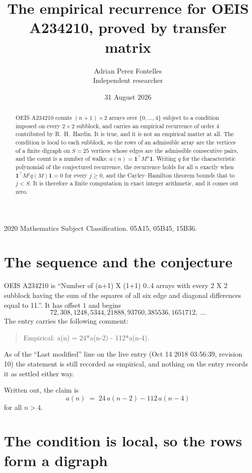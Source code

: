 \documentclass[11pt,a4paper]{article}
\title{The empirical recurrence for OEIS A234210, proved by transfer matrix}
\author{Adrian Perez Fontelles\\ \small Independent researcher}
\date{31 August 2026}
\theoremstyle{plain}
\theoremstyle{definition}
\begin{document}
\maketitle

\begin{abstract}
OEIS A234210 counts $(n+1)\times2$ arrays over $\{0,\dots,4\}$ subject to a condition imposed on
every $2\times2$ subblock, and carries an empirical recurrence of order $4$ contributed
by R.~H.~Hardin. It is true, and it is not an empirical matter at all. The condition is local
to each subblock, so the rows of an admissible array are the vertices of a finite digraph
on $S=25$ vertices whose edges are the admissible consecutive pairs, and the count is a
number of walks: $a(n)=\mathbf{1}^{\!\top}M^{n}\mathbf{1}$. Writing $q$
for the characteristic polynomial of the conjectured recurrence, the recurrence holds for all
$n$ exactly when $\mathbf{1}^{\!\top}M^{j}q(M)\mathbf{1}=0$ for every $j\ge0$, and the
Cayley--Hamilton theorem bounds that to $j<S$. It is therefore a finite computation in exact
integer arithmetic, and it comes out zero.
\end{abstract}

\noindent\small 2020 Mathematics Subject Classification. 05A15, 05B45, 15B36.\normalsize

\section{The sequence and the conjecture}

OEIS A234210 is ``Number of (n+1) X (1+1) 0..4 arrays with every 2 X 2 subblock having the sum of the squares of all six edge and diagonal differences equal to 11.''. It has offset $1$ and begins
\[
72, 308, 1248, 5344, 21888, 93760, 385536, 1651712,\ \dots
\]
The entry carries the following comment:
\begin{quote}\small
Empirical: a(n) = 24*a(n-2) - 112*a(n-4).
\end{quote}
As of the ``Last modified'' line on the live entry (Oct 14 2018 03:56:39, revision 10) the statement is
still recorded as empirical, and nothing on the entry records it as settled either way.

Written out, the claim is
\begin{equation}\label{eq:conj}
a(n)\;=\;24\,a(n-2) - 112\,a(n-4)
\end{equation}
for all $n>4$.

\section{The condition is local, so the rows form a digraph}
\end{document}
